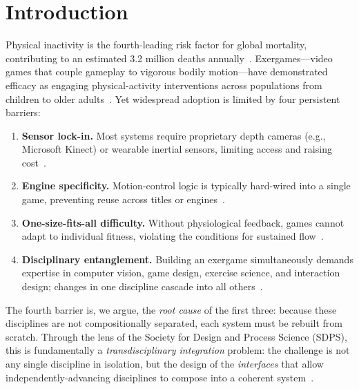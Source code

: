 \documentclass[runningheads]{llncs}
\begin{document}
\section{Introduction}
\label{sec:intro}

Physical inactivity is the fourth-leading risk factor for global mortality, contributing
to an estimated 3.2 million deaths annually~\cite{who2022inactivity}. Exergames---video
games that couple gameplay to vigorous bodily motion---have demonstrated efficacy as
engaging physical-activity interventions across populations from children to older
adults~\cite{staiano2011exergames,gao2015kinect}. Yet widespread adoption is limited by
four persistent barriers:

\begin{enumerate}
  \item \textbf{Sensor lock-in.} Most systems require proprietary depth cameras (e.g.,
        Microsoft Kinect) or wearable inertial sensors, limiting access and raising
        cost~\cite{chang2012kinectfit}.
  \item \textbf{Engine specificity.} Motion-control logic is typically hard-wired into a
        single game, preventing reuse across titles or
        engines~\cite{nystrom2014game,gregory2018game}.
  \item \textbf{One-size-fits-all difficulty.} Without physiological feedback, games
        cannot adapt to individual fitness, violating the conditions for sustained
        flow~\cite{csikszentmihalyi1990flow,sweetser2005gameflow}.
  \item \textbf{Disciplinary entanglement.} Building an exergame simultaneously demands
        expertise in computer vision, game design, exercise science, and interaction
        design; changes in one discipline cascade into all
        others~\cite{sinclair2007considerations}.
\end{enumerate}

The fourth barrier is, we argue, the \emph{root cause} of the first three: because
these disciplines are not compositionally separated, each system must be rebuilt from
scratch. Through the lens of the Society for Design and Process Science (SDPS),
this is fundamentally a \emph{transdisciplinary integration} problem: the
challenge is not any single discipline in isolation, but the design of the
\emph{interfaces} that allow independently-advancing disciplines to compose into a
coherent system~\cite{ertas2010transdisciplinary,nicolescu2002manifesto}.
\end{document}
